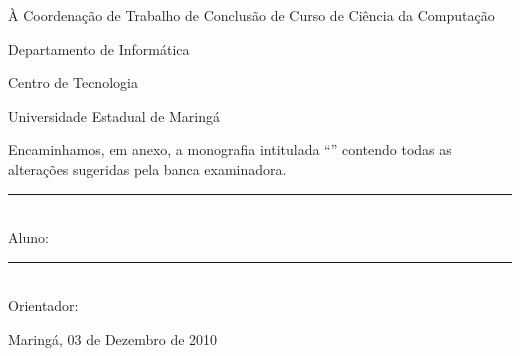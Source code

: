\pagestyle{empty}
\noindent
À Coordenação de Trabalho de Conclusão de Curso de Ciência da Computação

\noindent
Departamento de Informática

\noindent
Centro de Tecnologia

\noindent
Universidade Estadual de Maringá

\vspace{4cm}

Encaminhamos, em anexo, a monografia intitulada ``\doctitulo''
contendo todas as alterações sugeridas pela banca examinadora.

\vspace{2cm}

\begin{flushright}
\parbox{10cm}
{
\begin{center}

\rule{10cm}{.02cm} \\
Aluno: \docautor \\
\vspace{.40in}

\rule{10cm}{.02cm} \\
Orientador: \docorient \\

\end{center}
}

\end{flushright}


\vspace{7cm}


\begin{center}

Maringá, 03 de Dezembro de 2010

\end{center}
